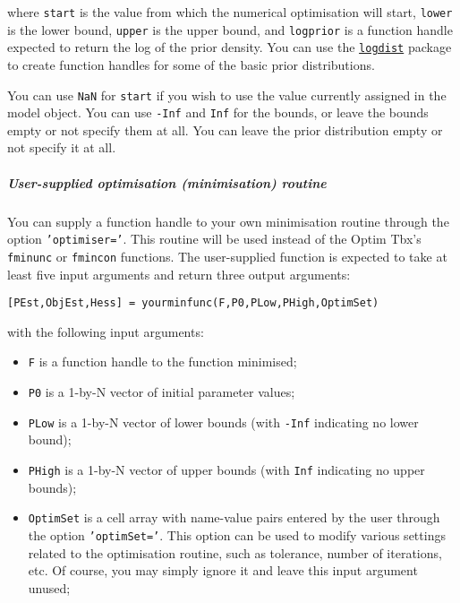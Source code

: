 where \texttt{start} is the value from which the numerical optimisation
will start, \texttt{lower} is the lower bound, \texttt{upper} is the
upper bound, and \texttt{logprior} is a function handle expected to
return the log of the prior density. You can use the
\href{logdist/Contents}{\texttt{logdist}} package to create function
handles for some of the basic prior distributions.

You can use \texttt{NaN} for \texttt{start} if you wish to use the value
currently assigned in the model object. You can use \texttt{-Inf} and
\texttt{Inf} for the bounds, or leave the bounds empty or not specify
them at all. You can leave the prior distribution empty or not specify
it at all.

\subparagraph{User-supplied optimisation (minimisation)
routine}\label{user-supplied-optimisation-minimisation-routine}

You can supply a function handle to your own minimisation routine
through the option \texttt{'optimiser='}. This routine will be used
instead of the Optim Tbx's \texttt{fminunc} or \texttt{fmincon}
functions. The user-supplied function is expected to take at least five
input arguments and return three output arguments:

\begin{verbatim}
[PEst,ObjEst,Hess] = yourminfunc(F,P0,PLow,PHigh,OptimSet)
\end{verbatim}

with the following input arguments:

\begin{itemize}
\itemsep1pt\parskip0pt
\item
  \texttt{F} is a function handle to the function minimised;
\item
  \texttt{P0} is a 1-by-N vector of initial parameter values;
\item
  \texttt{PLow} is a 1-by-N vector of lower bounds (with \texttt{-Inf}
  indicating no lower bound);
\item
  \texttt{PHigh} is a 1-by-N vector of upper bounds (with \texttt{Inf}
  indicating no upper bounds);
\item
  \texttt{OptimSet} is a cell array with name-value pairs entered by the
  user through the option \texttt{'optimSet='}. This option can be used
  to modify various settings related to the optimisation routine, such
  as tolerance, number of iterations, etc. Of course, you may simply
  ignore it and leave this input argument unused;
\end{itemize}


